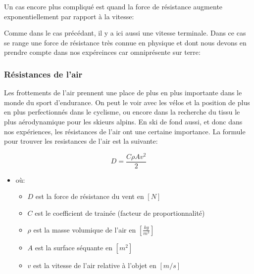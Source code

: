 \documentclass{article}
\begin{document}
Un cas encore plus compliqué est quand la force de résistance augmente exponentiellement par rapport à la vitesse:

\begin{center}
\end{center}

Comme dans le cas précédant, il y a ici aussi une vitesse terminale. 
\newline Dans ce cas se range une force de résistance très connue en physique et dont nous devons en prendre compte dans nos expéreinces car omniprésente sur terre:



\subsubsection{Résistances de l'air}

Les frottements de l'air prennent une place de plus en plus importante dans le monde du sport d'endurance. On peut le voir avec les vélos et la position de plus en plus perfectionnés dans le cyclisme, ou encore dans la recherche du tissu le plus aérodynamique pour les skieurs alpins. En ski de fond aussi, et donc dans nos expériences, les résistances de l'air ont une certaine importance. La formule pour trouver les resistances de l'air est la suivante:

\begin{equation}
    \label{Airdrag}
    D = \frac{C \rho A v^2}{2}
\end{equation}

\begin{itemize}
    \item où:
    \begin{itemize}
        \item $D$ est la force de résistance du vent en $[N]$
        \item $C$ est le coefficient de trainée (facteur de proportionnalité)
        \item $\rho$ est la masse volumique de l'air en $[\frac{kg}{m^3}]$
        \item $A$ est la surface séquante en $[m^2]$
        \item $v$ est la vitesse de l'air relative à l'objet en $[m/s]$
    \end{itemize}
\end{itemize}
\end{document}

